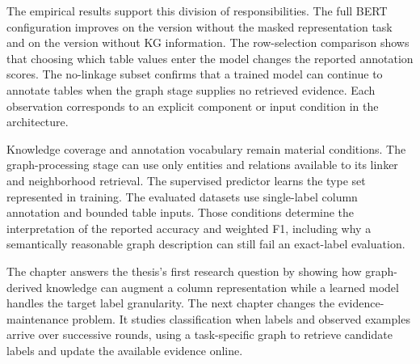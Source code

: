 The empirical results support this division of responsibilities. The full BERT configuration improves on the version without the masked representation task and on the version without KG information. The row-selection comparison shows that choosing which table values enter the model changes the reported annotation scores. The no-linkage subset confirms that a trained model can continue to annotate tables when the graph stage supplies no retrieved evidence. Each observation corresponds to an explicit component or input condition in the architecture.

Knowledge coverage and annotation vocabulary remain material conditions. The graph-processing stage can use only entities and relations available to its linker and neighborhood retrieval. The supervised predictor learns the type set represented in training. The evaluated datasets use single-label column annotation and bounded table inputs. Those conditions determine the interpretation of the reported accuracy and weighted F1, including why a semantically reasonable graph description can still fail an exact-label evaluation.

The chapter answers the thesis's first research question by showing how graph-derived knowledge can augment a column representation while a learned model handles the target label granularity. The next chapter changes the evidence-maintenance problem. It studies classification when labels and observed examples arrive over successive rounds, using a task-specific graph to retrieve candidate labels and update the available evidence online.
